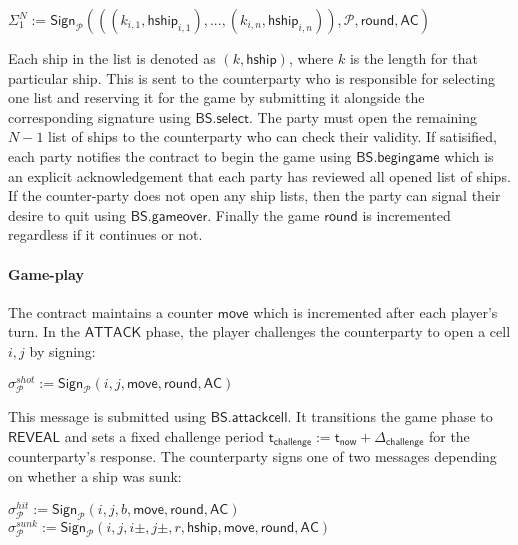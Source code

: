 \documentclass{llncs}
\newcommand{\gameattack}{\mathsf{ATTACK}}
\newcommand{\gamereveal}{\mathsf{REVEAL}}
\newcommand{\hship}{\mathsf{hship}}
\newcommand{\participant}{\mathcal{P}}
\newcommand{\sign}{\mathsf{Sign}}
\newcommand{\battleshipattackcell}{\mathsf{BS.attackcell}}
\newcommand{\battleshipbegin}{\mathsf{BS.begingame}}
\newcommand{\battleshipselectboard}{\mathsf{BS.select}}
\newcommand{\battleshipgameover}{\mathsf{BS.gameover}}
\newcommand{\appcontract}{\mathsf{AC}}
\newcommand{\timerchallenge}{\mathsf{\Delta}_{\mathsf{challenge}}}
\newcommand{\timechallenge}{\mathsf{t}_{\mathsf{challenge}}}
\newcommand{\timenow}{\mathsf{t}_{\mathsf{now}}}
\begin{document}
\begin{center}
 $\Sigma_{1}^{N} := \sign_{\participant}(((k_{i,1},\hship_{i,1}),...,(k_{i,n},\hship_{i,n})), \participant, \mathsf{round}, \appcontract)$ 
\end{center}
 
Each ship in the list is denoted as $(k,\hship)$, where $k$ is the length for that particular ship.  
This is sent to the counterparty who is responsible for selecting one list and reserving it for the game by submitting it alongside the corresponding signature using $\battleshipselectboard$. 
The party must open the remaining $N-1$ list of ships to the counterparty who can check their validity. 
If satisified, each party notifies the contract to begin the game using $\battleshipbegin$ which is an explicit acknowledgement that each party has reviewed all opened list of ships.
If the counter-party does not open any ship lists, then the party can signal their desire to quit  using $\battleshipgameover$.
Finally the game $\mathsf{round}$ is incremented regardless if it continues or not. 

\paragraph{Game-play} \label{sec:gameplayships}
The contract maintains a counter $\mathsf{move}$ which is incremented after each player's turn. 
In the $\gameattack$ phase, the player challenges the counterparty to open a cell $i,j$ by signing: 

\begin{center}
	$\sigma^{shot}_{\participant} := \sign_{\participant}(i,j, \mathsf{move}, \mathsf{round},\appcontract)$ \\
\end{center}

This message is submitted using $\battleshipattackcell$.
It transitions the game phase to $\gamereveal$ and sets a fixed challenge period $\timechallenge := \timenow + \timerchallenge$ for the counterparty's response. 
The counterparty signs one of two messages depending on whether a ship was sunk:

\begin{center}
	$\sigma^{hit}_{\participant} := \sign_{\participant}(i,j,b,\mathsf{move}, \mathsf{round},\appcontract)$ \\ $\sigma^{sunk}_{\participant} := \sign_{\participant}(i,j,i\pm,j\pm,r,\hship,\mathsf{move}, \mathsf{round},\appcontract)$
\end{center}
\end{document}
